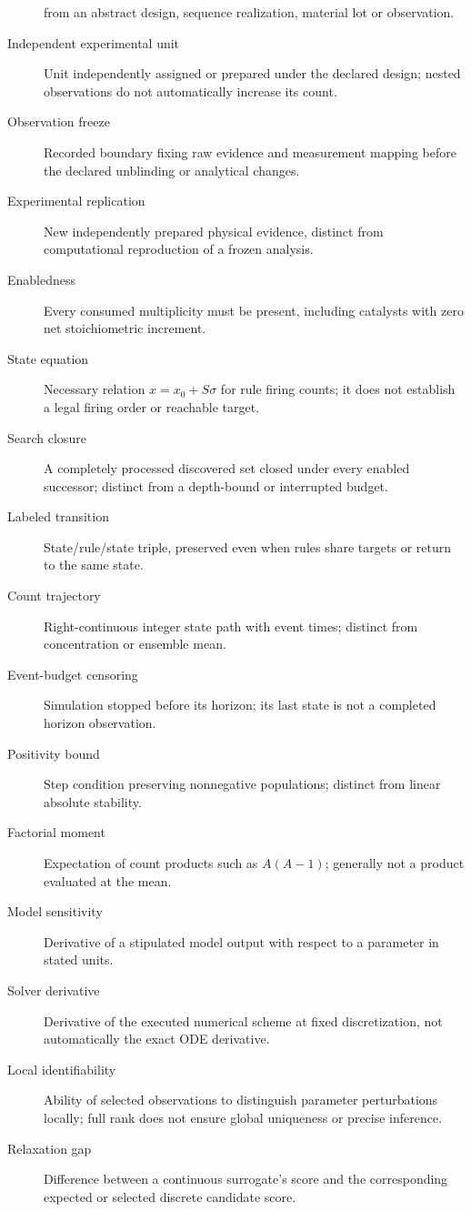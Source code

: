 \begin{description}
from an abstract design, sequence realization, material lot or observation.
\item[Independent experimental unit] Unit independently assigned or prepared under
the declared design; nested observations do not automatically increase its count.
\item[Observation freeze] Recorded boundary fixing raw evidence and measurement
mapping before the declared unblinding or analytical changes.
\item[Experimental replication] New independently prepared physical evidence,
distinct from computational reproduction of a frozen analysis.
\item[Enabledness] Every consumed multiplicity must be present, including catalysts
with zero net stoichiometric increment.
\item[State equation] Necessary relation $x=x_0+S\sigma$ for rule firing counts;
it does not establish a legal firing order or reachable target.
\item[Search closure] A completely processed discovered set closed under every
enabled successor; distinct from a depth-bound or interrupted budget.
\item[Labeled transition] State/rule/state triple, preserved even when rules share
targets or return to the same state.
\item[Count trajectory] Right-continuous integer state path with event times; distinct from concentration or ensemble mean.
\item[Event-budget censoring] Simulation stopped before its horizon; its last state is not a completed horizon observation.
\item[Positivity bound] Step condition preserving nonnegative populations; distinct from linear absolute stability.
\item[Factorial moment] Expectation of count products such as $A(A-1)$; generally not a product evaluated at the mean.
\item[Model sensitivity] Derivative of a stipulated model output with respect to a parameter in stated units.
\item[Solver derivative] Derivative of the executed numerical scheme at fixed discretization, not automatically the exact ODE derivative.
\item[Local identifiability] Ability of selected observations to distinguish parameter perturbations locally; full rank does not ensure global uniqueness or precise inference.
\item[Relaxation gap] Difference between a continuous surrogate's score and the corresponding expected or selected discrete candidate score.

\end{description}
